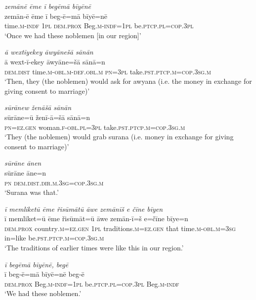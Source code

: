 \ea \label{RE.56}
\textit{zemānē ēme ī begēmā bīyēnē} \\ 
\gll zemān-ē ēme ī beg-ē=mā bīyē=nē \\ 
 time\textsc{.m}\textsc{-indf} \textsc{1pl} \textsc{dem.prox} Beg\textsc{.m}\textsc{-indf}\textsc{=\textsc{1pl}} be\textsc{.ptcp}\textsc{.pl}\textsc{=cop}\textsc{.3pl} \\ 
\glt `Once we had these noblemen [in our region]'
\z 
 
\ea \label{RE.58}
\textit{ā wextīyekey āwyānešā sānān} \\ 
\gll ā wext-ī-ekey āwyāne=šā sānā=n \\ 
 \textsc{dem.dist} time\textsc{.m}\textsc{-obl}\textsc{.m}\textsc{-def}\textsc{.obl}\textsc{.m} \textsc{pn}\textsc{=3pl} take\textsc{.pst}\textsc{.ptcp}\textsc{.m}\textsc{=cop}\textsc{.3sg}\textsc{.m} \\ 
\glt `Then, they (the noblemen) would ask for awyana (i.e. the money in exchange for giving consent to marriage)'
\z 
 
\ea \label{RE.59}
\textit{sūrānew ženāšā sānān} \\ 
\gll sūrāne=ū ženī-ā=šā sānā=n \\ 
 \textsc{pn}\textsc{=ez.gen} woman\textsc{.f}\textsc{-obl}\textsc{.pl}\textsc{=3pl} take\textsc{.pst}\textsc{.ptcp}\textsc{.m}\textsc{=cop}\textsc{.3sg}\textsc{.m} \\ 
\glt `They (the noblemen) would grab surana (i.e. money in exchange for giving consent to marriage)'
\z 
 
\ea \label{RE.61}
\textit{sūrāne ānen} \\ 
\gll sūrāne āne=n \\ 
 \textsc{pn} \textsc{dem.dist}\textsc{.dir}\textsc{.m}\textsc{.3sg}\textsc{=cop}\textsc{.3sg}\textsc{.m} \\ 
\glt `Surana was that.'
\z 
 
\ea \label{RE.62}
\textit{ī memliketū ēme řisūmātū āwe zemānīš e čīne bīyen} \\ 
\gll ī memliket=ū ēme řisūmāt=ū āwe zemān-ī=š e=čīne bīye=n \\ 
 \textsc{dem.prox} country\textsc{.m}\textsc{=ez.gen} \textsc{1pl} traditions\textsc{.m}\textsc{=ez.gen} that time\textsc{.m}\textsc{-obl}\textsc{.m}\textsc{=3sg} in=like be\textsc{.pst}\textsc{.ptcp}\textsc{.m}\textsc{=cop}\textsc{.3sg}\textsc{.m} \\ 
\glt `The traditions of earlier times were like this in our region.'
\z 
 
\ea \label{RE.63}
\textit{ī begēmā bīyēnē, begē} \\ 
\gll ī beg-ē=mā bīyē=nē beg-ē \\ 
 \textsc{dem.prox} Beg\textsc{.m}\textsc{-indf}\textsc{=\textsc{1pl}} be\textsc{.ptcp}\textsc{.pl}\textsc{=cop}\textsc{.3pl} Beg\textsc{.m}\textsc{-indf} \\ 
\glt `We had these noblemen.'
\z 
 
